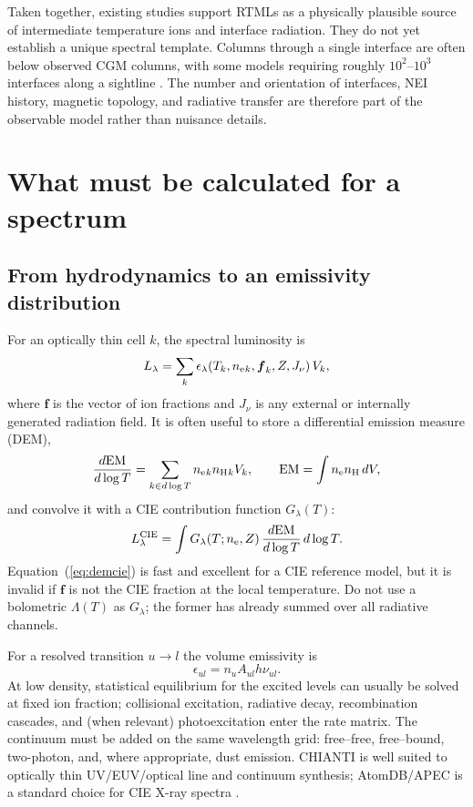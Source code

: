 \documentclass[english,a4paper]{my_memo2}
\newcommand{\nelec}{n_{\rm e}}
\newcommand{\nH}{n_{\rm H}}
\begin{document}
Taken together, existing studies support RTMLs as a physically plausible
source of intermediate temperature ions and interface radiation.  They do not
yet establish a unique spectral template.  Columns through a single interface are often
below observed CGM columns, with some models requiring roughly
$10^2$--$10^3$ interfaces along a sightline \cite{TanOh2021,Ji2019}.  The
number and orientation of interfaces, NEI history, magnetic topology, and
radiative transfer are therefore part of the observable model rather than
nuisance details.

\section{What must be calculated for a spectrum}

\subsection{From hydrodynamics to an emissivity distribution}

For an optically thin cell $k$, the spectral luminosity is
\begin{equation}
 L_\lambda=\sum_k \epsilon_\lambda(T_k,\nelec{}_{k},\boldsymbol{f}_k,
 Z, J_\nu)\,V_k,
 \label{eq:sum}
\end{equation}
where $\boldsymbol{f}$ is the vector of ion fractions and $J_\nu$ is any
external or internally generated radiation field.  It is often useful to
store a differential emission measure (DEM),
\begin{equation}
 \frac{d\mathrm{EM}}{d\log T}=\sum_{k\in d\log T}\nelec{}_{k}\nH{}_{k}V_k,
 \qquad \mathrm{EM}=\int\nelec\nH\,dV,
 \label{eq:dem}
\end{equation}
and convolve it with a CIE contribution function $G_\lambda(T)$:
\begin{equation}
 L_\lambda^{\rm CIE}=\int G_\lambda(T;\nelec,Z)\,
 \frac{d\mathrm{EM}}{d\log T}\,d\log T.
 \label{eq:demcie}
\end{equation}
Equation~(\ref{eq:demcie}) is fast and excellent for a CIE reference model,
but it is invalid if $\boldsymbol{f}$ is not the CIE fraction at the local
temperature.  Do not use a bolometric $\Lambda(T)$ as $G_\lambda$; the former
has already summed over all radiative channels.

For a resolved transition $u\rightarrow l$ the volume emissivity is
\begin{equation}
 \epsilon_{ul}=n_u A_{ul}h\nu_{ul}.
 \label{eq:lineem}
\end{equation}
At low density, statistical equilibrium for the excited levels can usually be
solved at fixed ion fraction; collisional excitation, radiative decay,
recombination cascades, and (when relevant) photoexcitation enter the rate
matrix.  The continuum must be added on the same wavelength grid: free--free,
free--bound, two-photon, and, where appropriate, dust emission.  CHIANTI is
well suited to optically thin UV/EUV/optical line and continuum synthesis;
AtomDB/APEC is a standard choice for CIE X-ray spectra \cite{CHIANTI,AtomDB}.
\end{document}
